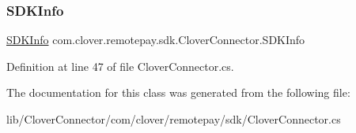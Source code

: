 \subsubsection{\texorpdfstring{S\+D\+K\+Info}{SDKInfo}}
{\footnotesize\ttfamily \hyperlink{classcom_1_1clover_1_1remotepay_1_1sdk_1_1_s_d_k_info}{S\+D\+K\+Info} com.\+clover.\+remotepay.\+sdk.\+Clover\+Connector.\+S\+D\+K\+Info\hspace{0.3cm}{\ttfamily [get]}}



Definition at line 47 of file Clover\+Connector.\+cs.



The documentation for this class was generated from the following file\+:\begin{DoxyCompactItemize}
\item 
lib/\+Clover\+Connector/com/clover/remotepay/sdk/Clover\+Connector.\+cs\end{DoxyCompactItemize}
